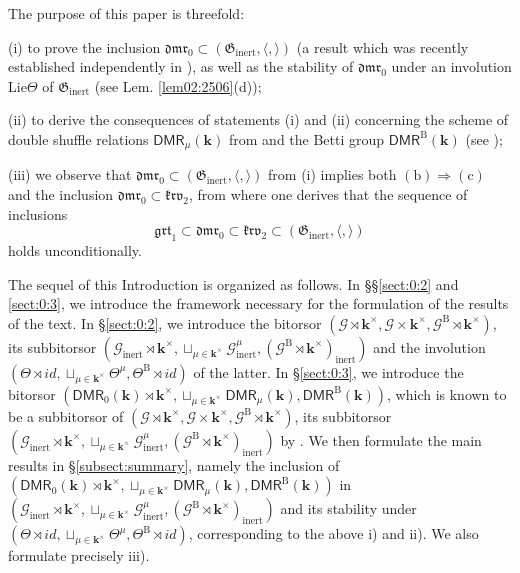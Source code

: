 \documentclass[10pt]{amsart}
\newcommand{\Add}[1]{\textcolor{black}{#1}} %
\numberwithin{equation}{subsection}
\begin{document}
The purpose of this paper is threefold: 

(i) to prove the inclusion $\mathfrak{dmr}_0\subset (\mathfrak G_{\mathrm{inert}},\langle,\rangle)$
(a result which was recently established independently in \cite{Sch2,Kaw}), as
well as the stability of $\mathfrak{dmr}_0$ 
under an involution $\mathrm{Lie}\Theta$ of $\mathfrak G_{\mathrm{inert}}$ 
(see Lem. \ref{lem02:2506}(d)); 

(ii) to derive the consequences of statements (i) and (ii) concerning the scheme of double 
shuffle relations 
$\mathsf{DMR}_\mu(\mathbf k)$ from \cite{R} and the Betti group 
$\mathsf{DMR}^{\mathrm B}(\mathbf k)$ (see \cite{EF3}); 

(iii) we observe that   $\mathfrak{dmr}_0\subset (\mathfrak G_{\mathrm{inert}},\langle,\rangle)$
from (i) implies both $(\mathrm{b})\Rightarrow(\mathrm{c})$ and the inclusion 
$\mathfrak{dmr}_0\subset \mathfrak{krv}_2$, from where one derives that the sequence of 
inclusions 
$$
\mathfrak{grt}_1\subset \mathfrak{dmr}_0\subset \mathfrak{krv}_2\subset (\mathfrak G_{\mathrm{inert}},\langle,\rangle)
$$ 
holds unconditionally. 
 

The sequel of this Introduction is organized as follows. 
In \S\S\ref{sect:0:2} and \ref{sect:0:3}, we introduce the framework necessary for the 
formulation of the results of the text. In \S\ref{sect:0:2}, we introduce the 
bitorsor $(\mathcal G\rtimes\mathbf k^\times,\mathcal G\times\mathbf k^\times,
\mathcal G^{\mathrm B}\rtimes\mathbf k^\times)$, its subbitorsor 
$(\mathcal G_{\mathrm{inert}} \rtimes \mathbf k^\times,
\sqcup_{\mu\in\mathbf k^\times}\mathcal G_{\mathrm{inert}}^\mu,
(\mathcal G^{\mathrm B} \rtimes \mathbf k^\times)_{\mathrm{inert}})$ and the involution  
$(\Theta\rtimes id,\sqcup_{\mu\in\mathbf k^\times}\Theta^\mu,\Theta^{\mathrm B}\rtimes id)$ of the latter. 
In \S\ref{sect:0:3}, we introduce the bitorsor $(\mathsf{DMR}_0(\mathbf k)\rtimes\mathbf k^\times,
\sqcup_{\mu\in\mathbf k^\times}\mathsf{DMR}_\mu(\mathbf k),
\mathsf{DMR}^{\mathrm B}(\mathbf k))$, which is known to be a subbitorsor of $(\mathcal G\rtimes\mathbf k^\times,\mathcal G\times\mathbf k^\times,
\mathcal G^{\mathrm B}\rtimes\mathbf k^\times)$, its subbitorsor 
$(\mathcal G_{\mathrm{inert}} \rtimes \mathbf k^\times,
\sqcup_{\mu\in\mathbf k^\times}\mathcal G_{\mathrm{inert}}^\mu,
(\mathcal G^{\mathrm B} \rtimes \mathbf k^\times)_{\mathrm{inert}})$ by \cite{EF3}. 
We then formulate the main results in \S\ref{subsect:summary}, namely the inclusion of $(\mathsf{DMR}_0(\mathbf k)\rtimes\mathbf k^\times,
\sqcup_{\mu\in\mathbf k^\times}\mathsf{DMR}_\mu(\mathbf k),
\mathsf{DMR}^{\mathrm B}(\mathbf k))$ in $(\mathcal G_{\mathrm{inert}} \rtimes \mathbf k^\times,
\sqcup_{\mu\in\mathbf k^\times}\mathcal G_{\mathrm{inert}}^\mu,
(\mathcal G^{\mathrm B} \rtimes \mathbf k^\times)_{\mathrm{inert}})$ and
its stability under 
$(\Theta\rtimes id,\sqcup_{\mu\in\mathbf k^\times}\Theta^\mu,\Theta^{\mathrm B}\rtimes id)$, corresponding to the above i) and ii). We also formulate precisely iii).
\end{document}
